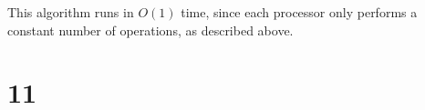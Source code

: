 \documentclass[letterpaper,notitlepage,twoside]{article}
\begin{document}
This algorithm runs in $O(1)$ time, since each processor only performs a constant number of operations, as described above.

\section*{11}
\end{document}
